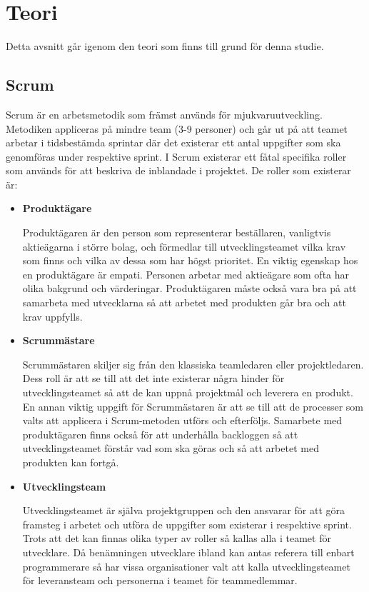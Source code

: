 \section{Teori}
Detta avsnitt går igenom den teori som finns till grund för denna studie.

\subsection{Scrum} \label{adam_scrum}
Scrum är en arbetsmetodik som främst används för mjukvaruutveckling.\cite{scrum} Metodiken appliceras på mindre team (3-9 personer) och går ut på att teamet arbetar i tidsbestämda sprintar där det existerar ett antal uppgifter som ska genomföras under respektive sprint.
I Scrum existerar ett fåtal specifika roller som används för att beskriva de inblandade i projektet. De roller som existerar är:

\begin{itemize}
	\item \textbf{Produktägare}
	
	Produktägaren är den person som representerar beställaren, vanligtvis aktieägarna i större bolag, och förmedlar till utvecklingsteamet vilka krav som finns och vilka av dessa som har högst prioritet. En viktig egenskap hos en produktägare är empati. Personen arbetar med aktieägare som ofta har olika bakgrund och värderingar. Produktägaren måste också vara bra på att samarbeta med utvecklarna så att arbetet med produkten går bra och att krav uppfylls.
	
	\item \textbf{Scrummästare}
	
	Scrummästaren skiljer sig från den klassiska teamledaren eller projektledaren. Dess roll är att se till att det inte existerar några hinder för utvecklingsteamet så att de kan uppnå projektmål och leverera en produkt. En annan viktig uppgift för Scrummästaren är att se till att de processer som valts att applicera i Scrum-metoden utförs och efterföljs. Samarbete med produktägaren finns också för att underhålla backloggen så att utvecklingsteamet förstår vad som ska göras och så att arbetet med produkten kan fortgå.
	
	\item \textbf{Utvecklingsteam}
	
	Utvecklingsteamet är själva projektgruppen och den ansvarar för att göra framsteg i arbetet och utföra de uppgifter som existerar i respektive sprint. Trots att det kan finnas olika typer av roller så kallas alla i teamet för utvecklare. Då benämningen utvecklare ibland kan antas referera till enbart programmerare så har vissa organisationer valt att kalla utvecklingsteamet för leveransteam och personerna i teamet för teammedlemmar.	
\end{itemize}

